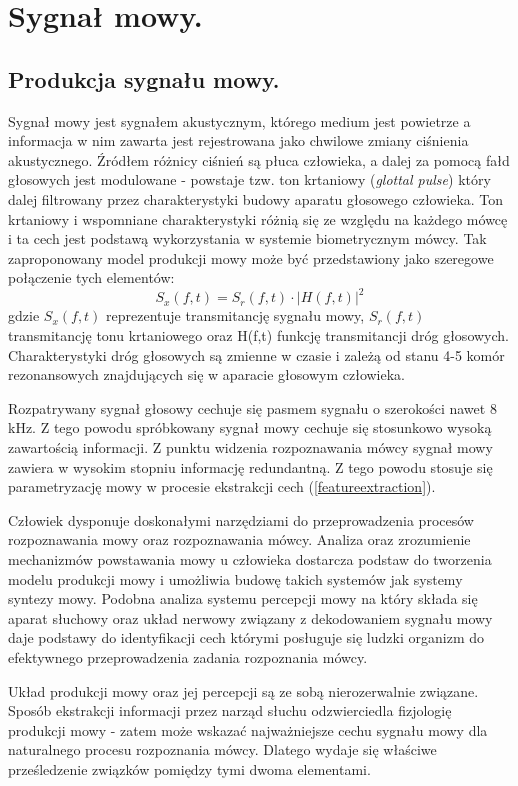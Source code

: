 \section{Sygnał mowy.}

\subsection{Produkcja sygnału mowy.}
Sygnał mowy jest sygnałem akustycznym, którego medium jest powietrze a informacja w nim zawarta jest rejestrowana jako chwilowe zmiany ciśnienia akustycznego. Źródłem różnicy ciśnień są płuca człowieka, a dalej za pomocą fałd głosowych jest modulowane - powstaje tzw. ton krtaniowy (\textit{glottal pulse}) który dalej filtrowany przez charakterystyki budowy aparatu głosowego człowieka. Ton krtaniowy i wspomniane charakterystyki różnią się ze względu na każdego mówcę i ta cech jest podstawą wykorzystania w systemie biometrycznym mówcy. Tak zaproponowany model produkcji mowy może być przedstawiony jako szeregowe połączenie tych elementów\cite{multidsp}:
\begin{equation}
  S_x(f,t) = S_r(f,t) \cdot |H(f,t)|^2
\end{equation}
gdzie $S_x(f,t)$ reprezentuje transmitancję sygnału mowy, $S_r(f,t)$ transmitancję tonu krtaniowego oraz H(f,t) funkcję transmitancji dróg głosowych. Charakterystyki dróg głosowych są zmienne w czasie i zależą od stanu 4-5 komór rezonansowych znajdujących się w aparacie głosowym człowieka.

Rozpatrywany sygnał głosowy cechuje się pasmem sygnału o szerokości nawet 8 kHz. Z tego powodu spróbkowany sygnał mowy cechuje się stosunkowo wysoką zawartością informacji. Z punktu widzenia rozpoznawania mówcy sygnał mowy zawiera w wysokim stopniu informację redundantną. Z tego powodu stosuje się parametryzację mowy w procesie ekstrakcji cech (\ref{featureextraction}).

Człowiek dysponuje doskonałymi narzędziami do przeprowadzenia procesów rozpoznawania mowy oraz rozpoznawania mówcy. Analiza oraz zrozumienie mechanizmów powstawania mowy u człowieka dostarcza podstaw do tworzenia modelu produkcji mowy i umożliwia budowę takich systemów jak systemy syntezy mowy. Podobna analiza systemu percepcji mowy na który składa się aparat słuchowy oraz układ nerwowy związany z dekodowaniem sygnału mowy daje podstawy do identyfikacji cech którymi posługuje się ludzki organizm do efektywnego przeprowadzenia zadania rozpoznania mówcy.

Układ produkcji mowy oraz jej percepcji są ze sobą nierozerwalnie związane. Sposób ekstrakcji informacji przez narząd słuchu odzwierciedla fizjologię produkcji mowy - zatem może wskazać najważniejsze cechu sygnału mowy dla naturalnego procesu rozpoznania mówcy. Dlatego wydaje się właściwe prześledzenie związków pomiędzy tymi dwoma elementami.

